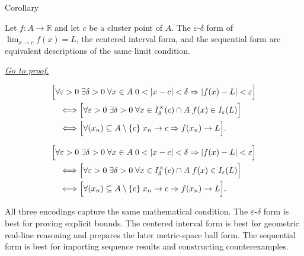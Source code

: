 \begin{corollarybox}{Corollary}
\begin{corollary}
\label{cor:limit-three-equiv}
Let $f : A \to \mathbb{R}$ and let $c$ be a cluster point of $A$.
The $\varepsilon$-$\delta$ form of $\lim_{x\to c}f(x)=L$, the
centered interval form, and the sequential form are equivalent descriptions
of the same limit condition.

\smallskip\noindent
\hyperref[prf:limit-three-equiv]{\textit{Go to proof.}}
\end{corollary}
\end{corollarybox}

\begin{remark*}
\[
\begin{aligned}
&\Bigl[\forall\varepsilon>0\;\exists\delta>0\;\forall x\in A\;
  0<|x-c|<\delta\Rightarrow |f(x)-L|<\varepsilon\Bigr] \\
&\quad\Longleftrightarrow
\Bigl[\forall\varepsilon>0\;\exists\delta>0\;\forall x\in I_\delta^\times(c)\cap A\;
  f(x)\in I_\varepsilon(L)\Bigr] \\
&\quad\Longleftrightarrow
\Bigl[\forall (x_n)\subseteq A\setminus\{c\}\;
  x_n\to c\Rightarrow f(x_n)\to L\Bigr].
\end{aligned}
\]
\end{remark*}

\begin{remark*}
\[
\begin{aligned}
&\Bigl[\forall\varepsilon>0\;\exists\delta>0\;\forall x\in A\;
  0<|x-c|<\delta\Rightarrow |f(x)-L|<\varepsilon\Bigr] \\
&\quad\Longleftrightarrow
\Bigl[\forall\varepsilon>0\;\exists\delta>0\;\forall x\in I_\delta^\times(c)\cap A\;
  f(x)\in I_\varepsilon(L)\Bigr] \\
&\quad\Longleftrightarrow
\Bigl[\forall (x_n)\subseteq A\setminus\{c\}\;
  x_n\to c\Rightarrow f(x_n)\to L\Bigr].
\end{aligned}
\]
\end{remark*}

\begin{remark*}[Interpretation]
All three encodings capture the same mathematical condition. The
$\varepsilon$-$\delta$ form is best for proving explicit bounds. The
centered interval form is best for geometric real-line reasoning and prepares
the later metric-space ball form. The sequential form is best for importing sequence
results and constructing counterexamples.
\end{remark*}

